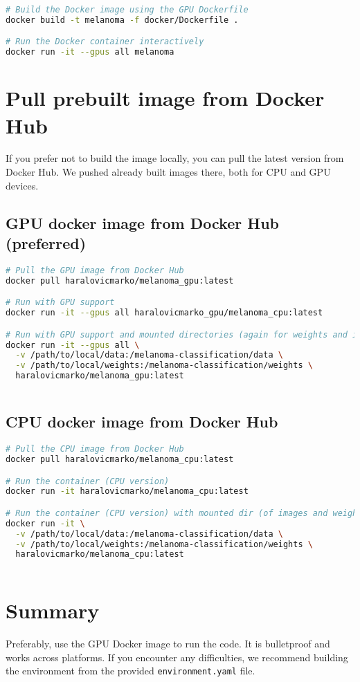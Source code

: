 \begin{lstlisting}[language=bash, caption={Build and run Docker container (GPU version)}]
# Build the Docker image using the GPU Dockerfile
docker build -t melanoma -f docker/Dockerfile .

# Run the Docker container interactively
docker run -it --gpus all melanoma
\end{lstlisting}



\section{Pull prebuilt image from Docker Hub}
If you prefer not to build the image locally, you can pull the latest version from Docker Hub. We pushed already built images there, both for CPU and GPU devices. 

\subsection{GPU docker image from Docker Hub (preferred)}
\begin{lstlisting}[language=bash, caption={Pull and run the Docker GPU enabled image from Docker Hub}, label=list:docker_hub]
# Pull the GPU image from Docker Hub
docker pull haralovicmarko/melanoma_gpu:latest

# Run with GPU support 
docker run -it --gpus all haralovicmarko_gpu/melanoma_cpu:latest

# Run with GPU support and mounted directories (again for weights and images dir)
docker run -it --gpus all \
  -v /path/to/local/data:/melanoma-classification/data \
  -v /path/to/local/weights:/melanoma-classification/weights \
  haralovicmarko/melanoma_gpu:latest
  
\end{lstlisting}

\subsection{CPU docker image from Docker Hub}
\begin{lstlisting}[language=bash, caption={Pull and run the Docker CPU enabled image from Docker Hub}, label=list:docker_hub]
# Pull the CPU image from Docker Hub
docker pull haralovicmarko/melanoma_cpu:latest

# Run the container (CPU version)
docker run -it haralovicmarko/melanoma_cpu:latest

# Run the container (CPU version) with mounted dir (of images and weights for example)
docker run -it \
  -v /path/to/local/data:/melanoma-classification/data \
  -v /path/to/local/weights:/melanoma-classification/weights \
  haralovicmarko/melanoma_cpu:latest
  
\end{lstlisting}

\section{Summary}
Preferably, use the GPU Docker image to run the code. It is bulletproof and works across platforms. If you encounter any difficulties, we recommend building the environment from the provided \texttt{environment.yaml} file. 

